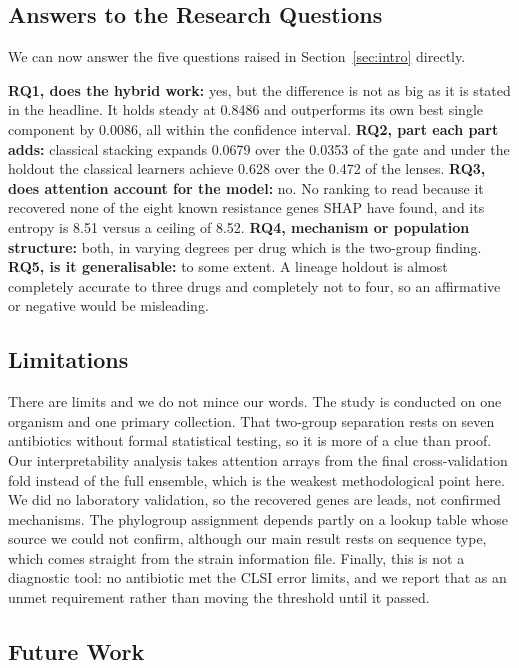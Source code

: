 \documentclass[conference]{IEEEtran}
\begin{document}
\subsection{Answers to the Research Questions}

We can now answer the five questions raised in Section~\ref{sec:intro} directly.

\textbf{RQ1, does the hybrid work:} yes, but the difference is not as big as it is
stated in the headline. It holds steady at 0.8486 and outperforms its own best
single component by 0.0086, all within the confidence interval. \textbf{RQ2, part
each part adds:} classical stacking expands 0.0679 over the 0.0353 of the gate and
under the holdout the classical learners achieve 0.628 over the 0.472 of the
lenses. \textbf{RQ3, does attention account for the model:} no. No ranking to read
because it recovered none of the eight known resistance genes SHAP have found, and
its entropy is 8.51 versus a ceiling of 8.52. \textbf{RQ4, mechanism or population
structure:} both, in varying degrees per drug which is the two-group finding.
\textbf{RQ5, is it generalisable:} to some extent. A lineage holdout is almost
completely accurate to three drugs and completely not to four, so an affirmative or
negative would be misleading.

\subsection{Limitations}

There are limits and we do not mince our words. The study is conducted on one
organism and one primary collection. That two-group separation rests on seven
antibiotics without formal statistical testing, so it is more of a clue than proof. Our interpretability
analysis takes attention arrays from the final cross-validation fold instead of the
full ensemble, which is the weakest methodological point here. We did no laboratory
validation, so the recovered genes are leads, not confirmed mechanisms. The
phylogroup assignment depends partly on a lookup table whose source we could not
confirm, although our main result rests on sequence type, which comes straight from
the strain information file. Finally, this is not a diagnostic tool: no antibiotic
met the CLSI error limits, and we report that as an unmet requirement rather than
moving the threshold until it passed.

\subsection{Future Work}
\end{document}
